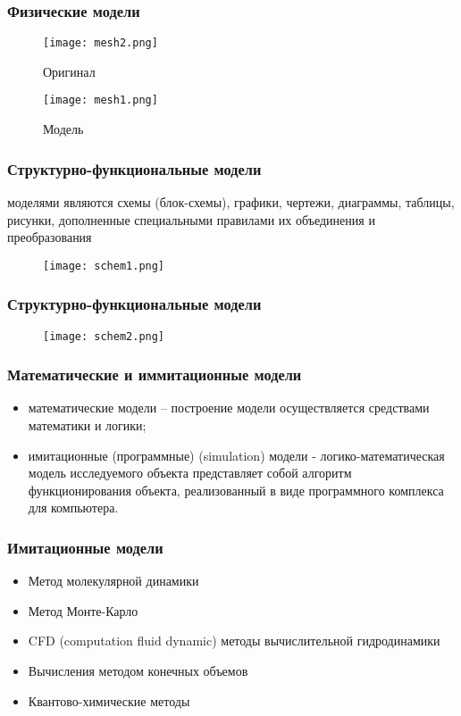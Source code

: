 \begin{frame}
	\frametitle{Физические модели}
	\begin{figure}
		\centering
		\begin{minipage}{0.45\textwidth}
			\centering
			\texttt{[image: mesh2.png]} %
			\caption{Оригинал}
		\end{minipage}\hfill
		\begin{minipage}{0.45\textwidth}
			\centering
			\texttt{[image: mesh1.png]} %
			\caption{Модель}
		\end{minipage}
	\end{figure}
\end{frame}

\begin{frame}
	\frametitle{Структурно-функциональные модели}
	моделями являются схемы (блок-схемы), графики, чертежи, диаграммы, таблицы, рисунки, дополненные специальными правилами их объединения и преобразования
	\begin{figure}[h]
		\texttt{[image: schem1.png]}
	\end{figure}
\end{frame}

\begin{frame}
	\frametitle{Структурно-функциональные модели}
	\begin{figure}[h]
		\texttt{[image: schem2.png]}
	\end{figure}
\end{frame}

\begin{frame}
	\frametitle{Математические и иммитационные модели}
	\begin{itemize}
		\item математические модели – построение модели осуществляется средствами математики и логики;
		\item имитационные (программные) (simulation) модели - логико-математическая модель исследуемого объекта представляет собой алгоритм функционирования объекта, реализованный в виде программного комплекса для компьютера.
	\end{itemize}
	
\end{frame}


\begin{frame}
	\frametitle{Имитационные модели}
	\begin{itemize}
	\item Метод молекулярной динамики
	\item Метод Монте-Карло
	\item CFD (computation fluid dynamic) методы вычислительной гидродинамики
	\item Вычисления методом конечных объемов
	\item Квантово-химические методы
	\end{itemize}
\end{frame}

